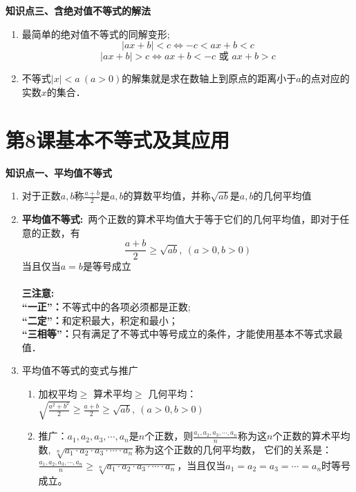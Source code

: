 \documentclass[11pt,a4paper]{ctexbook}
\begin{document}
\begin{formal}
    {\large \textbf{知识点三、含绝对值不等式的解法}}
\end{formal}

\begin{enumerate}
    \item 最简单的绝对值不等式的同解变形;
    $$
    |ax+b|<c \Leftrightarrow -c<ax+b<c 
    $$
    $$
    |ax+b|>c \Leftrightarrow ax+b<-c \text{\  或 \ }  ax+b>c
    $$
    \item 不等式$ |x|<a\ (a>0)$的解集就是求在数轴上到原点的距离小于$a$的点对应的实数$x$的集合．

\end{enumerate}
\clearpage
\section{第8课\quad 基本不等式及其应用}


\begin{formal}
    {\large \textbf{知识点一、平均值不等式}}
\end{formal}


\begin{enumerate}
    \item 对于正数$a,b$称$\displaystyle \frac{a+b}{2}\text{是}a,b\text{的算数平均值，并称}\sqrt{ab}\text{是}a,b\text{的几何平均值}$

    \item {\large{\textbf{平均值不等式:}}}\ 两个正数的算术平均值大于等于它们的几何平均值，即对于任意的正数，有
    $$
    \frac{a+b}{2}\ge \sqrt{ab},\ (a>0,b>0)
    $$
    当且仅当$a=b$是等号成立\\
    \\
    {\large{\textbf{三注意:}}}\\
    {\large{\textbf{“一正”：}}}不等式中的各项必须都是正数; \\
    {\large{\textbf{“二定”：}}}和定积最大，积定和最小； \\
    {\large{\textbf{“三相等”：}}}只有满足了不等式中等号成立的条件，才能使用基本不等式求最值．\\
    \item 平均值不等式的变式与推广
    \begin{enumerate}
        \item 加权平均$\ge$ 算术平均$\ge$ 几何平均：$\displaystyle \sqrt{\frac{a^2+b^2}{2}}\ge \frac{a+b}{2} \ge \sqrt{ab} , \ (a>0,b>0)$
    
        \item { 推广：$ a_1,a_2,a_3,\cdots,a_n$是$n$个正数，则$\displaystyle \frac{a_1,a_2,a_3,\cdots,a_n}{n}$称为这$n$个正数的算术平均数,
        $\sqrt[n]{a_1\cdot a_2\cdot a_3\cdot \cdots \cdot a_n}$称为这个正数的几何平均数，
        它们的关系是：$\displaystyle \frac{a_1,a_2,a_3,\cdots,a_n}{n} \ge \sqrt[n]{a_1\cdot a_2\cdot a_3\cdot \cdots \cdot a_n}$，当且仅当$  a_1=a_2=a_3=\cdots=a_n$时等号成立。}
    \end{enumerate}
\end{enumerate}
\end{document}
